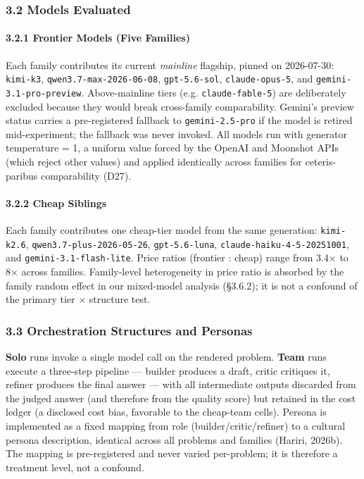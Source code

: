 \documentclass[11pt,a4paper]{article}
\begin{document}
\subsubsection{3.2 Models Evaluated}

\paragraph{3.2.1 Frontier Models (Five Families)}

Each family contributes its current \textit{mainline} flagship, pinned on
2026-07-30: \texttt{kimi-k3}, \texttt{qwen3.7-max-2026-06-08}, \texttt{gpt-5.6-sol},
\texttt{claude-opus-5}, and \texttt{gemini-3.1-pro-preview}. Above-mainline tiers
(e.g. \texttt{claude-fable-5}) are deliberately excluded because they would
break cross-family comparability. Gemini's preview status carries a
pre-registered fallback to \texttt{gemini-2.5-pro} if the model is retired
mid-experiment; the fallback was never invoked. All models run with
generator temperature = 1, a uniform value forced by the OpenAI and
Moonshot APIs (which reject other values) and applied identically
across families for ceteris-paribus comparability (D27).

\paragraph{3.2.2 Cheap Siblings}

Each family contributes one cheap-tier model from the same generation:
\texttt{kimi-k2.6}, \texttt{qwen3.7-plus-2026-05-26}, \texttt{gpt-5.6-luna},
\texttt{claude-haiku-4-5-20251001}, and \texttt{gemini-3.1-flash-lite}. Price ratios
(frontier : cheap) range from 3.4× to 8× across families. Family-level
heterogeneity in price ratio is absorbed by the family random effect
in our mixed-model analysis (§3.6.2); it is not a confound of the
primary tier × structure test.

\subsubsection{3.3 Orchestration Structures and Personas}

\textbf{Solo} runs invoke a single model call on the rendered problem.
\textbf{Team} runs execute a three-step pipeline — builder produces a draft,
critic critiques it, refiner produces the final answer — with all
intermediate outputs discarded from the judged answer (and therefore
from the quality score) but retained in the cost ledger (a disclosed
cost bias, favorable to the cheap-team cells). Persona is implemented
as a fixed mapping from role (builder/critic/refiner) to a cultural
persona description, identical across all problems and families
(Hariri, 2026b). The mapping is pre-registered and never varied
per-problem; it is therefore a treatment level, not a confound.
\end{document}
